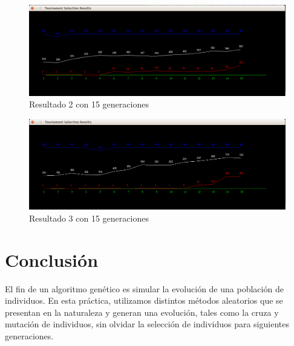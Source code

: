 \documentclass[11pt,letterpaper]{article}
\begin{document}
\begin{figure}[H]
	\centering
	\includegraphics[scale = 0.4]{images/15gen2}
	\caption{Resultado 2 con 15 generaciones}
\end{figure}

\begin{figure}[H]
	\centering
	\includegraphics[scale = 0.4]{images/15gen3}
	\caption{Resultado 3 con 15 generaciones}
\end{figure}


\section*{Conclusión}

El fin de un algoritmo genético es simular la evolución de una población de individuos. En esta práctica, utilizamos distintos métodos aleatorios que se presentan en la naturaleza y generan una evolución, tales como la cruza y mutación de individuos, sin olvidar la selección de individuos para siguientes generaciones.\\

\end{document}
